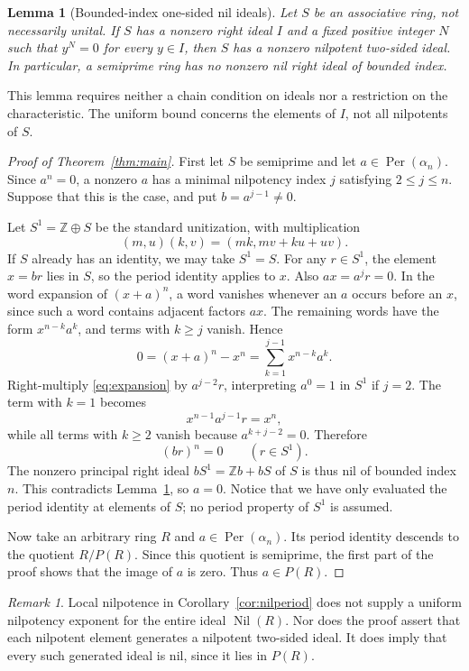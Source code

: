 \documentclass[11pt]{article}
\newtheorem{lemma}[theorem]{Lemma}
\theoremstyle{remark}
\newtheorem{remark}[theorem]{Remark}
\DeclareMathOperator{\Nil}{Nil}
\DeclareMathOperator{\Per}{Per}
\begin{document}
\begin{lemma}[Bounded-index one-sided nil ideals]\label{lem:levitzki}
Let $S$ be an associative ring, not necessarily unital. If $S$ has a nonzero
right ideal $I$ and a fixed positive integer $N$ such that $y^N=0$ for every
$y\in I$, then $S$ has a nonzero nilpotent two-sided ideal. In particular,
a semiprime ring has no nonzero nil right ideal of bounded index.
\end{lemma}

This lemma requires neither a chain condition on ideals nor a restriction on
the characteristic. The uniform bound concerns the elements of $I$, not all
nilpotents of $S$.

\begin{proof}[Proof of Theorem~\ref{thm:main}]
First let $S$ be semiprime and let $a\in\Per(\alpha_n)$. Since $a^n=0$,
a nonzero $a$ has a minimal nilpotency index $j$ satisfying $2\leq j\leq n$.
Suppose that this is the case, and put $b=a^{j-1}\ne0$.

Let $S^1=\mathbb Z\oplus S$ be the standard unitization, with multiplication
\[
 (m,u)(k,v)=(mk,mv+ku+uv).
\]
If $S$ already has an identity, we may take $S^1=S$. For any $r\in S^1$,
the element $x=br$ lies in $S$, so the period identity applies to $x$. Also
$ax=a^jr=0$. In the word expansion of $(x+a)^n$, a word vanishes whenever
an $a$ occurs before an $x$, since such a word contains adjacent factors $ax$.
The remaining words have the form $x^{n-k}a^k$, and terms with $k\geq j$
vanish. Hence
\begin{equation}\label{eq:expansion}
 0=(x+a)^n-x^n=\sum_{k=1}^{j-1}x^{n-k}a^k.
\end{equation}
Right-multiply \eqref{eq:expansion} by $a^{j-2}r$, interpreting $a^0=1$
in $S^1$ if $j=2$. The term with $k=1$ becomes
\[
 x^{n-1}a^{j-1}r=x^n,
\]
while all terms with $k\geq2$ vanish because $a^{k+j-2}=0$. Therefore
\[
 (br)^n=0\qquad(r\in S^1).
\]
The nonzero principal right ideal $bS^1=\mathbb Zb+bS$ of $S$ is thus nil
of bounded index $n$. This contradicts Lemma~\ref{lem:levitzki}, so $a=0$.
Notice that we have only evaluated the period identity at elements of $S$;
no period property of $S^1$ is assumed.

Now take an arbitrary ring $R$ and $a\in\Per(\alpha_n)$. Its period identity
descends to the quotient $R/P(R)$. Since this quotient is semiprime, the
first part of the proof shows that the image of $a$ is zero. Thus $a\in P(R)$.
\end{proof}

\begin{remark}
Local nilpotence in Corollary~\ref{cor:nilperiod} does not supply a uniform
nilpotency exponent for the entire ideal $\Nil(R)$. Nor does the proof
assert that each nilpotent element generates a nilpotent two-sided ideal.
It does imply that every such generated ideal is nil, since it lies in
$P(R)$.
\end{remark}
\end{document}
